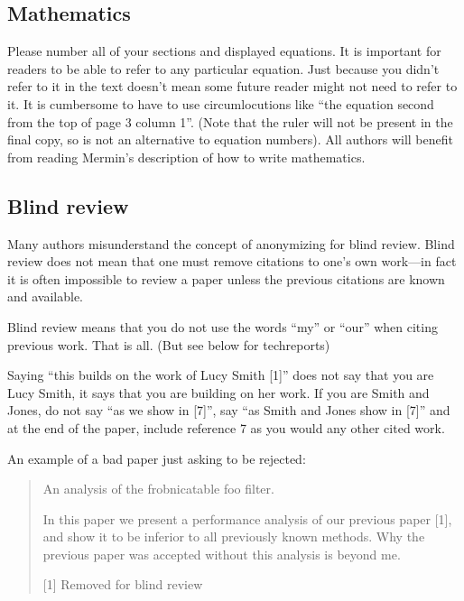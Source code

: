 \documentclass[10pt,twocolumn,letterpaper]{article}
\begin{document}
\subsection{Mathematics}

Please number all of your sections and displayed equations.  It is
important for readers to be able to refer to any particular equation.  Just
because you didn't refer to it in the text doesn't mean some future reader
might not need to refer to it.  It is cumbersome to have to use
circumlocutions like ``the equation second from the top of page 3 column
1''.  (Note that the ruler will not be present in the final copy, so is not
an alternative to equation numbers).  All authors will benefit from reading
Mermin's description of how to write mathematics.%


\subsection{Blind review}

Many authors misunderstand the concept of anonymizing for blind
review.  Blind review does not mean that one must remove
citations to one's own work---in fact it is often impossible to
review a paper unless the previous citations are known and
available.

Blind review means that you do not use the words ``my'' or ``our''
when citing previous work.  That is all.  (But see below for
techreports)

Saying ``this builds on the work of Lucy Smith [1]'' does not say
that you are Lucy Smith, it says that you are building on her
work.  If you are Smith and Jones, do not say ``as we show in
[7]'', say ``as Smith and Jones show in [7]'' and at the end of the
paper, include reference 7 as you would any other cited work.

An example of a bad paper just asking to be rejected:
\begin{quote}
\begin{center}
    An analysis of the frobnicatable foo filter.
\end{center}

   In this paper we present a performance analysis of our
   previous paper [1], and show it to be inferior to all
   previously known methods.  Why the previous paper was
   accepted without this analysis is beyond me.

   [1] Removed for blind review
\end{quote}
\end{document}

